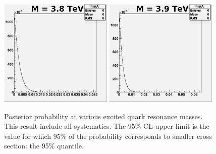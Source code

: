 \begin{figure}[!ht]
\begin{center}
     \includegraphics[width=0.48\textwidth]{Figures/MCpost3800_6_pe0.pdf}
     \includegraphics[width=0.48\textwidth]{Figures/MCpost3900_6_pe0.pdf}
 \caption{Posterior probability at
 various excited quark resonance masses.  This result include all systematics.
 The 95\% CL upper limit is the value for which 95\% of
 the probability corresponds to smaller cross section: the 95\% quantile.}
    \label{likeli5}
  \end{center}
\end{figure}

\clearpage

